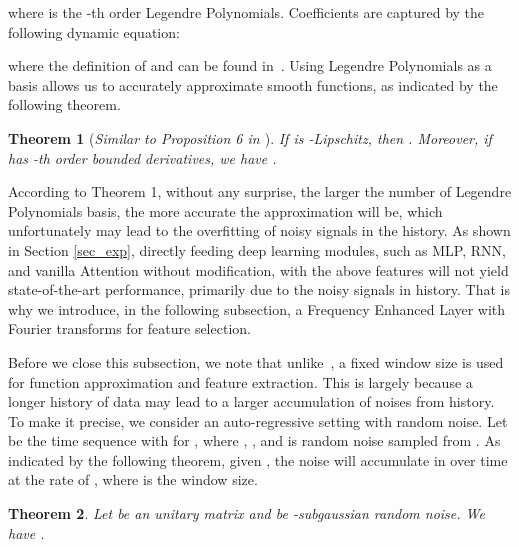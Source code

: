 \documentclass{article}
\newtheorem{theorem}{Theorem}
\begin{document}
 where  is the -th order Legendre Polynomials. Coefficients  are captured by the following dynamic equation:

where the definition of  and  can be found in~\cite{LMU}. Using Legendre Polynomials as a basis allows us to accurately approximate smooth functions, as indicated by the following theorem.

\begin{theorem} [\it Similar to Proposition 6 in \cite{Hippo}]
 If  is -Lipschitz, then . Moreover, if  has -th order bounded derivatives, we have .
\end{theorem}
According to Theorem 1, without any surprise, the larger the number of Legendre Polynomials basis, the more accurate the approximation will be, which unfortunately may lead to the overfitting of noisy signals in the history. As shown in Section \ref{sec_exp}, directly feeding deep learning modules, such as MLP, RNN, and vanilla Attention without modification, with the above features will not yield state-of-the-art performance, primarily due to the noisy signals in history. That is why we introduce, in the following subsection, a Frequency Enhanced Layer with Fourier transforms for feature selection.  



Before we close this subsection, we note that unlike~\cite{S4}, a fixed window size is used for function approximation and feature extraction. This is largely because a longer history of data may lead to a larger accumulation of noises from history. To make it precise, we consider an auto-regressive setting with random noise. Let  be the time sequence with  for , where , , and  is random noise sampled from . As indicated by the following theorem, given , the noise will accumulate in  over time at the rate of , where  is the window size.

\begin{theorem}
Let  be an unitary matrix and  be -subgaussian random noise.  We have .
\end{theorem}
\end{document}
